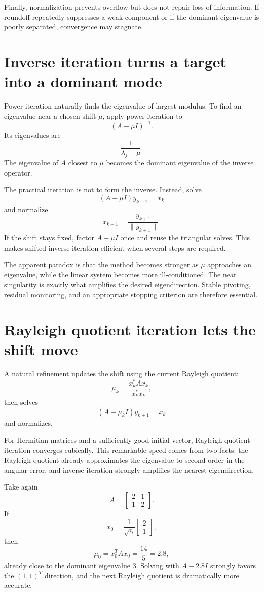 Finally, normalization prevents overflow but does not repair loss of information.  If roundoff repeatedly suppresses a weak component or if the dominant eigenvalue is poorly separated, convergence may stagnate.

\section{Inverse iteration turns a target into a dominant mode}

Power iteration naturally finds the eigenvalue of largest modulus.  To find an eigenvalue near a chosen shift \(\mu\), apply power iteration to
\[
  (A-\mu I)^{-1}.
\]
Its eigenvalues are
\[
  \frac1{\lambda_j-\mu}.
\]
The eigenvalue of \(A\) closest to \(\mu\) becomes the dominant eigenvalue of the inverse operator.

The practical iteration is not to form the inverse.  Instead, solve
\[
  (A-\mu I)y_{k+1}=x_k
\]
and normalize
\[
  x_{k+1}=\frac{y_{k+1}}{\|y_{k+1}\|}.
\]
If the shift stays fixed, factor \(A-\mu I\) once and reuse the triangular solves.  This makes shifted inverse iteration efficient when several steps are required.

The apparent paradox is that the method becomes stronger as \(\mu\) approaches an eigenvalue, while the linear system becomes more ill-conditioned.  The near singularity is exactly what amplifies the desired eigendirection.  Stable pivoting, residual monitoring, and an appropriate stopping criterion are therefore essential.

\section{Rayleigh quotient iteration lets the shift move}

A natural refinement updates the shift using the current Rayleigh quotient:
\[
  \mu_k=\frac{x_k^*Ax_k}{x_k^*x_k},
\]
then solves
\[
  (A-\mu_kI)y_{k+1}=x_k
\]
and normalizes.

For Hermitian matrices and a sufficiently good initial vector, Rayleigh quotient iteration converges cubically.  This remarkable speed comes from two facts: the Rayleigh quotient already approximates the eigenvalue to second order in the angular error, and inverse iteration strongly amplifies the nearest eigendirection.

Take again
\[
  A=
  \begin{bmatrix}
    2&1\\
    1&2
  \end{bmatrix}.
\]
If
\[
  x_0=\frac1{\sqrt5}
  \begin{bmatrix}2\\1\end{bmatrix},
\]
then
\[
  \mu_0=x_0^TAx_0=\frac{14}{5}=2.8,
\]
already close to the dominant eigenvalue \(3\).  Solving with \(A-2.8I\) strongly favors the \((1,1)^T\) direction, and the next Rayleigh quotient is dramatically more accurate.

